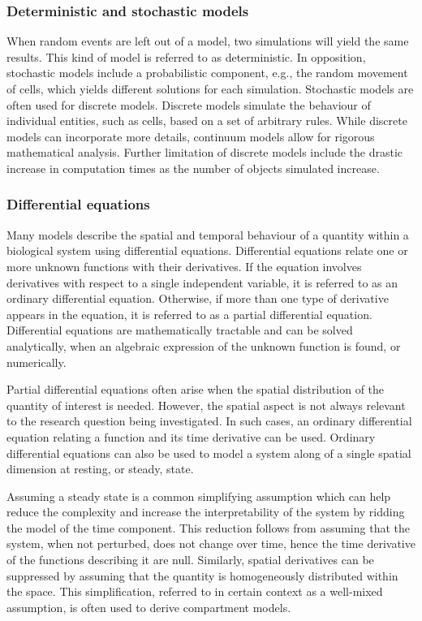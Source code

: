 \documentclass[12pt,a4paper]{article}
\begin{document}
\subsubsection*{Deterministic and stochastic models}

When random events are left out of a model, two simulations will yield the same results.
This kind of model is referred to as deterministic.
In opposition, stochastic models include a probabilistic component, e.g., the random movement of cells, which yields different solutions for each simulation.
Stochastic models are often used for discrete models.
Discrete models simulate the behaviour of individual entities, such as cells, based on a set of arbitrary rules.
While discrete models can incorporate more details, continuum models allow for rigorous mathematical analysis.
Further limitation of discrete models include the drastic increase in computation times as the number of objects simulated increase.

\subsubsection*{Differential equations}

Many models describe the spatial and temporal behaviour of a quantity within a biological system using differential equations.
Differential equations relate one or more unknown functions with their derivatives.
If the equation involves derivatives with respect to a single independent variable, it is referred to as an ordinary differential equation.
Otherwise, if more than one type of derivative appears in the equation, it is referred to as a partial differential equation.
Differential equations are mathematically tractable and can be solved analytically, when an algebraic expression of the unknown function is found, or numerically.

Partial differential equations often arise when the spatial distribution of the quantity of interest is needed.
However, the spatial aspect is not always relevant to the research question being investigated.
In such cases, an ordinary differential equation relating a function and its time derivative can be used.
Ordinary differential equations can also be used to model a system along of a single spatial dimension at resting, or steady, state.

Assuming a steady state is a common simplifying assumption which can help reduce the complexity and increase the interpretability of the system by ridding the model of the time component.
This reduction follows from assuming that the system, when not perturbed, does not change over time, hence the time derivative of the functions describing it are null.
Similarly, spatial derivatives can be suppressed by assuming that the quantity is homogeneously distributed within the space.
This simplification, referred to in certain context as a well-mixed assumption, is often used to derive compartment models.
\end{document}
